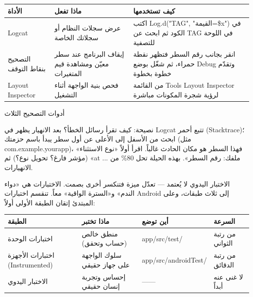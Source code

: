 


\begin{center}
\begin{tabularx}{\linewidth}{|X|X|X|}
\hline
\textbf{الأداة} & \textbf{ماذا تفعل} & \textbf{كيف تستخدمها} \tabularnewline
\hline
Logcat & عرض سجلات النظام أو سجلاتك الخاصة & اكتب Log.d("TAG", "القيمة=\$x") في الكود ثم ابحث عن TAG في اللوحة للتصفية \tabularnewline
التصحيح بنقاط التوقف & إيقاف البرنامج عند سطر معيّن ومشاهدة قيم المتغيرات & انقر بجانب رقم السطر فتظهر نقطة حمراء، ثم شغّل بوضع Debug وتقدّم خطوة بخطوة \tabularnewline
Layout Inspector & فحص بنية الواجهة أثناء التشغيل & من القائمة Tools Layout Inspector لرؤية شجرة المكونات مباشرة \tabularnewline
\hline
\end{tabularx}
\end{center}

\begin{center}\small\color{gray}أدوات التصحيح الثلاث\end{center}

\begin{tcbinfo}{نصيحة: كيف تقرأ رسائل الخطأ؟}
بعد الانهيار يظهر في Logcat تتبع أحمر (Stacktrace)؛ ابحث من الأسفل إلى الأعلى عن أول سطر يبدأ باسم حزمتك (مثل com.example.yourapp)، فهذا السطر هو مكان الحادث غالباً. اقرأ أولاً «نوع الاستثناء» (مؤشر فارغ؟ تحويل نوع؟) ثم «at ... ملفك: رقم السطر». بهذه الحيلة تحل 80\% من الانهيارات.

\end{tcbinfo}


الاختبار اليدوي لا يُعتمد — تعدّل ميزة فتنكسر أخرى بصمت. الاختبارات هي «دواء الندم» و«السترة الواقية» معاً. تنقسم اختبارات Android إلى ثلاث طبقات، وعلى المبتدئ إتقان الطبقة الأولى أولاً:

\begin{center}
\begin{tabularx}{\linewidth}{|X|X|X|X|}
\hline
\textbf{الطبقة} & \textbf{ماذا تختبر} & \textbf{أين توضع} & \textbf{السرعة} \tabularnewline
\hline
اختبارات الوحدة & منطق خالص (حساب وتحقق) & app/src/test/ & من رتبة الثواني \tabularnewline
اختبارات الأجهزة (Instrumented) & سلوك الواجهة على جهاز حقيقي & app/src/androidTest/ & من رتبة الدقائق \tabularnewline
الاختبار اليدوي & إحساس وتجربة إنسان حقيقي & —— & لا غنى عنه أبداً \tabularnewline
\hline
\end{tabularx}
\end{center}

